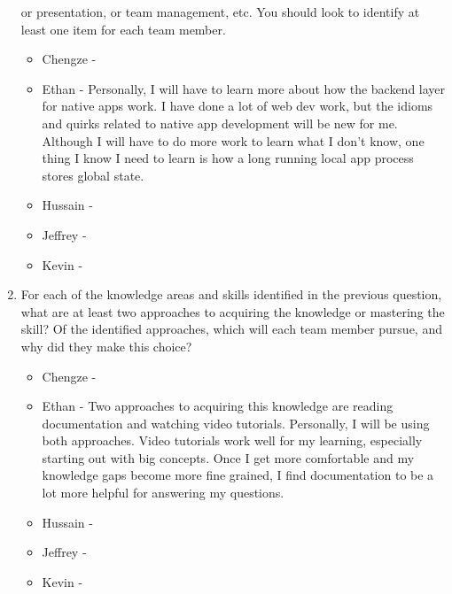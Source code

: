 \begin{enumerate}
  or presentation, or team management, etc.  You should look to identify at
  least one item for each team member.
  \begin{itemize}
        \item Chengze - 
        \item Ethan - Personally, I will have to learn more about how the
          backend layer for native apps work. I have done a lot of web dev
          work, but the idioms and quirks related to native app development
          will be new for me. Although I will have to do more work to learn
          what I don't know, one thing I know I need to learn is how a long
          running local app process stores global state.
        \item Hussain - 
        \item Jeffrey - 
        \item Kevin - 
  \end{itemize} 
  \item For each of the knowledge areas and skills identified in the previous
  question, what are at least two approaches to acquiring the knowledge or
  mastering the skill?  Of the identified approaches, which will each team
  member pursue, and why did they make this choice?
  \begin{itemize}
        \item Chengze - 
        \item Ethan - Two approaches to acquiring this knowledge are reading
          documentation and watching video tutorials. Personally, I will be
          using both approaches. Video tutorials work well for my learning,
          especially starting out with big concepts. Once I get more
          comfortable and my knowledge gaps become more fine grained, I find
          documentation to be a lot more helpful for answering my questions.
        \item Hussain - 
        \item Jeffrey - 
        \item Kevin - 
  \end{itemize} 
\end{enumerate}
